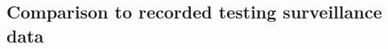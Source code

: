 \documentclass[fleqn,10pt]{wlscirep}
\begin{document}
\begin{figure}[!ht]
\centering
\caption{}
\label{fig:forest}
\end{figure}

\subsection*{Comparison to recorded testing surveillance data}

\begin{figure}[!ht]
\centering
\caption{}
\label{fig:scatterall}
\end{figure}

\begin{figure}[!ht]
\centering
\caption{}
\label{fig:bubble}
\end{figure}
\end{document}
